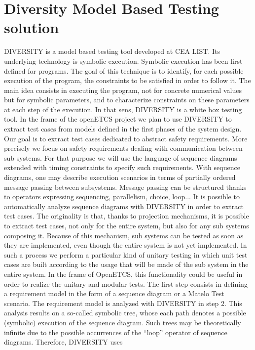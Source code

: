 \section{Diversity Model Based Testing solution}
DIVERSITY is a model based testing tool developed at CEA LIST. Its
underlying technology is symbolic execution. Symbolic execution has
been first defined for programs. The goal of this technique is to
identify, for each possible execution of the program, the constraints
to be satisfied in order to follow it. The main idea consists in
executing the program, not for concrete numerical values but for
symbolic parameters, and to characterize constraints on these
parameters at each step of the execution.  In that sens, DIVERSITY is
a white box testing tool.  In the frame of the openETCS project we
plan to use DIVERSITY to extract test cases from models defined in the
first phases of the system design. Our goal is to extract test cases
dedicated to abstract safety requirements. More precisely we focus on
safety requirements dealing with communication between sub
systems. For that purpose we will use the language of sequence
diagrams extended with timing constraints to specify such
requirements. With sequence diagrams, one may describe execution
scenarios in terms of partially ordered message passing between
subsystems. Message passing can be structured thanks to operators
expressing sequencing, parallelism, choice, loop...  It is possible to
automatically analyze sequence diagrams with DIVERSITY in order to
extract test cases. The originality is that, thanks to projection
mechanisms, it is possible to extract test cases, not only for the
entire system, but also for any sub systems composing it. Because of
this mechanism, sub systems can be tested as soon as they are
implemented, even though the entire system is not yet implemented. In
such a process we perform a particular kind of unitary testing in
which unit test cases are built according to the usage that will be
made of the sub system in the entire system. In the frame of OpenETCS,
this functionality could be useful in order to realize the unitary and
modular tests.  The first step consists in defining a requirement
model in the form of a sequence diagram or a Matelo Test scenario. The
requirement model is analyzed with DIVERSITY in step 2. This analysis
results on a so-called symbolic tree, whose each path denotes a
possible (symbolic) execution of the sequence diagram. Such trees may
be theoretically infinite due to the possible occurrences of the
``loop'' operator of sequence diagrams. Therefore, DIVERSITY uses
